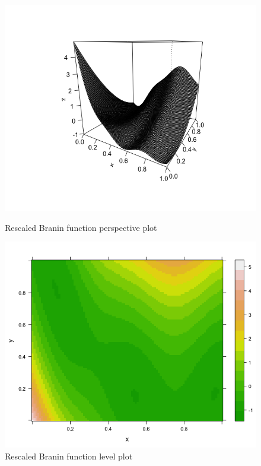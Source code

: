 \begin{figure}[!htb]
    \centering
    \begin{minipage}{.5\textwidth}
        \centering
        \includegraphics[width=1.064\linewidth, height=0.3\textheight]{gfx/chapter-bayesianrvfl/resc_branin_persp.png}
        \caption{Rescaled Branin function perspective plot}
        \label{resc_branin_persp}
    \end{minipage}%
    \begin{minipage}{0.5\textwidth}
        \centering
        \includegraphics[width=1.064\linewidth, height=0.3\textheight]{gfx/chapter-bayesianrvfl/resc_branin_levelplot.png}
        \caption{Rescaled Branin function level plot}
        \label{resc_branin_levelplot}
    \end{minipage}
\end{figure}

